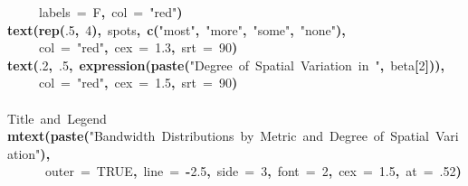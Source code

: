\documentclass{article}
\makeatletter
\newcommand{\hlnumber}[1]{\textcolor[rgb]{0,0,0}{#1}}%
\newcommand{\hlfunctioncall}[1]{\textcolor[rgb]{0.501960784313725,0,0.329411764705882}{\textbf{#1}}}%
\newcommand{\hlstring}[1]{\textcolor[rgb]{0.6,0.6,1}{#1}}%
\newcommand{\hlkeyword}[1]{\textcolor[rgb]{0,0,0}{\textbf{#1}}}%
\newcommand{\hlargument}[1]{\textcolor[rgb]{0.690196078431373,0.250980392156863,0.0196078431372549}{#1}}%
\newcommand{\hlcomment}[1]{\textcolor[rgb]{0.180392156862745,0.6,0.341176470588235}{#1}}%
\newcommand{\hlsymbol}[1]{\textcolor[rgb]{0,0,0}{#1}}%
\newcommand{\hlstd}[1]{\textcolor[rgb]{0,0,0}{#1}}%
\newenvironment{kframe}{%
 \def\FrameCommand##1{\hskip\@totalleftmargin \hskip-\fboxsep
 \colorbox{shadecolor}{##1}\hskip-\fboxsep
     \hskip-\linewidth \hskip-\@totalleftmargin \hskip\columnwidth}%
 \MakeFramed {\advance\hsize-\width
   \@totalleftmargin\z@ \linewidth\hsize
   \@setminipage}}%
 {\par\unskip\endMakeFramed}
\newenvironment{knitrout}{}{} %
\makeatother
\begin{document}
\begin{knitrout}
\begin{kframe}
\begin{flushleft}
\hlstd{}{\ }{\ }{\ }{\ }{\ }\hlargument{labels}{\ }\hlargument{=}{\ }\hlsymbol{F}\hlkeyword{,}{\ }\hlargument{col}{\ }\hlargument{=}{\ }\hlstring{"{}red"{}}\hlkeyword{)}\hspace*{\fill}\\
\hlstd{}\hlfunctioncall{text}\hlkeyword{(}\hlfunctioncall{rep}\hlkeyword{(}\hlnumber{.5}\hlkeyword{,}{\ }\hlnumber{4}\hlkeyword{)}\hlkeyword{,}{\ }\hlsymbol{spots}\hlkeyword{,}{\ }\hlfunctioncall{c}\hlkeyword{(}\hlstring{"{}most"{}}\hlkeyword{,}{\ }\hlstring{"{}more"{}}\hlkeyword{,}{\ }\hlstring{"{}some"{}}\hlkeyword{,}{\ }\hlstring{"{}none"{}}\hlkeyword{)}\hlkeyword{,}\hspace*{\fill}\\
\hlstd{}{\ }{\ }{\ }{\ }{\ }\hlargument{col}{\ }\hlargument{=}{\ }\hlstring{"{}red"{}}\hlkeyword{,}{\ }\hlargument{cex}{\ }\hlargument{=}{\ }\hlnumber{1.3}\hlkeyword{,}{\ }\hlargument{srt}{\ }\hlargument{=}{\ }\hlnumber{90}\hlkeyword{)}\hspace*{\fill}\\
\hlstd{}\hlfunctioncall{text}\hlkeyword{(}\hlnumber{.2}\hlkeyword{,}{\ }\hlnumber{.5}\hlkeyword{,}{\ }\hlfunctioncall{expression}\hlkeyword{(}\hlfunctioncall{paste}\hlkeyword{(}\hlstring{"{}Degree{\ }of{\ }Spatial{\ }Variation{\ }in{\ }"{}}\hlkeyword{,}{\ }\hlsymbol{beta}\hlkeyword{[}\hlnumber{2}\hlkeyword{]}\hlkeyword{)}\hlkeyword{)}\hlkeyword{,}\hspace*{\fill}\\
\hlstd{}{\ }{\ }{\ }{\ }{\ }\hlargument{col}{\ }\hlargument{=}{\ }\hlstring{"{}red"{}}\hlkeyword{,}{\ }\hlargument{cex}{\ }\hlargument{=}{\ }\hlnumber{1.5}\hlkeyword{,}{\ }\hlargument{srt}{\ }\hlargument{=}{\ }\hlnumber{90}\hlkeyword{)}\hspace*{\fill}\\
\hlstd{}\hspace*{\fill}\\
\hlstd{}\hlcomment{\usebox{\hlnormalsizeboxhash}{\ }Title{\ }and{\ }Legend}\hspace*{\fill}\\
\hlstd{}\hlfunctioncall{mtext}\hlkeyword{(}\hlfunctioncall{paste}\hlkeyword{(}\hlstring{"{}Bandwidth{\ }Distributions{\ }by{\ }Metric{\ }and{\ }Degree{\ }of{\ }Spatial{\ }Variation"{}}\hlkeyword{)}\hlkeyword{,}\hspace*{\fill}\\
\hlstd{}{\ }{\ }{\ }{\ }{\ }{\ }\hlargument{outer}{\ }\hlargument{=}{\ }\hlnumber{TRUE}\hlkeyword{,}{\ }\hlargument{line}{\ }\hlargument{=}{\ }\hlkeyword{-}\hlnumber{2.5}\hlkeyword{,}{\ }\hlargument{side}{\ }\hlargument{=}{\ }\hlnumber{3}\hlkeyword{,}{\ }\hlargument{font}{\ }\hlargument{=}{\ }\hlnumber{2}\hlkeyword{,}{\ }\hlargument{cex}{\ }\hlargument{=}{\ }\hlnumber{1.5}\hlkeyword{,}{\ }\hlargument{at}{\ }\hlargument{=}{\ }\hlnumber{.52}\hlkeyword{)}\hspace*{\fill}\\

\end{flushleft}
\end{kframe}
\end{knitrout}
\end{document}
